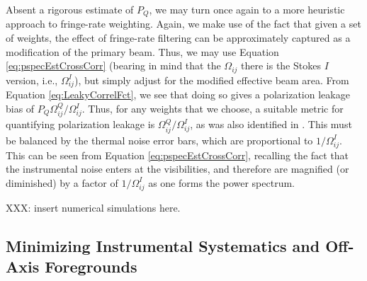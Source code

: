 \documentclass[twocolumn,apj,numberedappendix]{emulateapj}
\begin{document}
Absent a rigorous estimate of $P_Q$, we may turn once again to a more heuristic approach
to fringe-rate weighting. Again, we make use of the fact that given a set of weights, the effect
of fringe-rate filtering can be approximately captured as a modification of the primary beam.
Thus, we may use Equation \eqref{eq:pspecEstCrossCorr} (bearing in mind that the
$\Omega_{ij}$ there is the Stokes $I$ version, i.e., $\Omega_{ij}^I$), but simply adjust for the
modified effective beam area. From Equation \eqref{eq:LeakyCorrelFct}, we see that doing
so gives a polarization leakage bias of $P_Q \Omega_{ij}^Q / \Omega_{ij}^I$. Thus, for any
weights that we choose, a suitable metric for quantifying polarization leakage is
$\Omega_{ij}^Q / \Omega_{ij}^I$, as was also identified in \citet{moore_et_al2015}. This
must be balanced by the thermal noise error bars, which are proportional to $1 / \Omega_{ij}^I$.
This can be seen from Equation \eqref{eq:pspecEstCrossCorr}, recalling the fact that
the instrumental noise enters at the visibilities, and therefore are magnified (or diminished) by
a factor of $1 / \Omega_{ij}^I$ as one forms the power spectrum.

XXX: insert numerical simulations here.


\subsection{Minimizing Instrumental Systematics and Off-Axis Foregrounds}
\label{sec:foregrounds}
\end{document}
